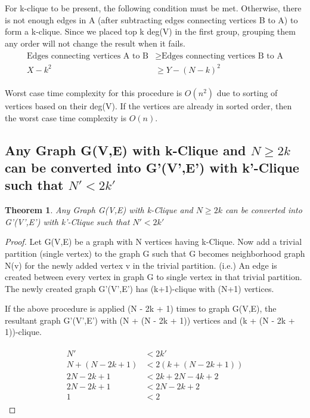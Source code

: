 \documentclass[12pt]{article}
\theoremstyle{plain}
\newtheorem{theorem}{Theorem}[section] %
\theoremstyle{definition}
\begin{document}
For k-clique to be present, the following condition must be met. Otherwise, there is not enough edges in A (after subtracting edges connecting vertices B to A) to form a k-clique. Since we placed top k deg(V) in the first group, grouping them any order will not change the result when it fails.
\begin{align} 
\begin{split}
	\text{Edges connecting vertices A to B} &\ge \text{Edges connecting vertices B to A} \\
	X - k^2 &\ge Y - (N-k)^2 \label{eq:1}
\end{split}
\end{align}

Worst case time complexity for this procedure is $O(n^2)$ due to sorting of vertices based on their deg(V). If the vertices are already in sorted order, then the worst case time complexity is $O(n)$.


\subsection{Any Graph G(V,E) with k-Clique and $N \ge 2k$ can be converted into G'(V',E') with  k'-Clique such that $N' < 2k'$} \label{AnyGraphTo2k}

\begin{theorem}
	Any Graph G(V,E) with k-Clique and $N \ge 2k$ can be converted into G'(V',E') with  k'-Clique such that $N' < 2k'$
\end{theorem}

\begin{proof}
	Let G(V,E) be a graph with N vertices having k-Clique. Now add a trivial partition (single vertex) to the graph G such that G becomes neighborhood graph N(v) for the newly added vertex v in the trivial partition. (i.e.) An edge is created between every vertex in graph G to single vertex in that trivial partition. The newly created graph G'(V',E') has (k+1)-clique with (N+1) vertices.
	
	If the above procedure is applied (N - 2k + 1) times to graph G(V,E), the resultant graph G'(V',E') with (N + (N - 2k + 1)) vertices and (k + (N - 2k + 1))-clique.
	
\begin{align}
\begin{split}
	N' &< 2k' \\
	N + (N - 2k + 1) &< 2(k + (N - 2k + 1)) \\
	2N - 2k + 1 &< 2k + 2N - 4k + 2 \\
	2N - 2k + 1 &< 2N - 2k + 2 \\
	1 &< 2
\end{split}
\end{align}
\end{proof}
\end{document}
